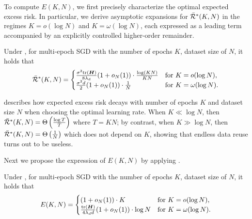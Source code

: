 
To compute $E(K,N)$, we first precisely characterize the optimal expected excess risk. 
In particular, we derive asymptotic expansions for $\Bar{\mathcal{R}}^*(K,N)$ in the regimes $K=o(\log N)$ and $K=\omega(\log N)$, each expressed as a leading term accompanied by an explicitly controlled higher\mbox{-}order remainder.

\begin{theorem}\label{thm:strongly-convex-scaling-law}
    Under , for multi-epoch SGD with the number of epochs $K$, dataset size of $N$, it holds that
\[
\Bar{\mathcal{R}}^*(K,N) = 
\begin{cases}
     \frac{\sigma^2\mathrm{tr}({\bm{H}})}{8\lambda_d}(1+o_N(1)) \cdot \frac{\log(KN)}{KN} & \text{for } K = o(\log N), \\
     \frac{\sigma^2d}{2}(1+o_N(1)) \cdot \frac{1}{N} & \text{for } K = \omega(\log N).
\end{cases}
\]
\end{theorem}

\vspace{-0.1in}
 describes how expected excess risk decays with number of epochs $K$ and dataset size $N$ when choosing the optimal learning rate. When $K\ll \log N$, then $\Bar{\mathcal{R}}^*(K,N) =\Theta\left(\frac{\log T}{T}\right)$ where $T = KN$; by contrast, when $K\gg \log N$, then $\Bar{\mathcal{R}}^*(K,N) =\Theta\left(\frac{1}{N}\right)$ which does not depend on $K$, showing that endless data reuse turns out to be useless.

Next we propose the expression of $E(K,N)$ by applying .
\begin{theorem}\label{thm:convex-E_K}
    Under , for multi-epoch SGD with the number of epochs $K$, dataset size of $N$, it holds that
\[
E(K,N) = 
\begin{cases}
     (1 + o_N(1))\cdot K & \text{for } K = o(\log N), \\
     \frac{\mathrm{tr}({\bm{H}})}{4\lambda_d d}(1+o_N(1)) \cdot \log N & \text{for } K = \omega(\log N).
\end{cases}
\]
\end{theorem}

